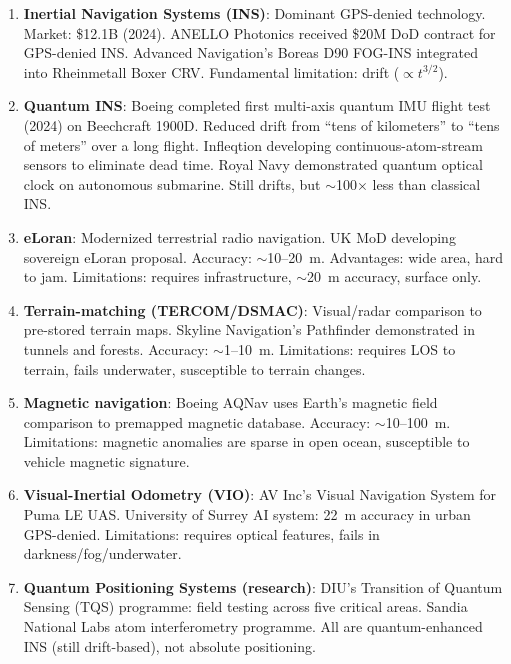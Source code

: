 \documentclass[11pt]{article}
\theoremstyle{definition}
\theoremstyle{remark}
\begin{document}
\begin{enumerate}
\item \textbf{Inertial Navigation Systems (INS)}: Dominant GPS-denied technology.
  Market: \$12.1B (2024). ANELLO Photonics received \$20M DoD contract for GPS-denied
  INS. Advanced Navigation's Boreas D90 FOG-INS integrated into Rheinmetall Boxer CRV.
  Fundamental limitation: drift ($\propto t^{3/2}$).

\item \textbf{Quantum INS}: Boeing completed first multi-axis quantum IMU flight test
  (2024) on Beechcraft 1900D. Reduced drift from ``tens of kilometers'' to ``tens of
  meters'' over a long flight. Infleqtion developing continuous-atom-stream sensors
  to eliminate dead time. Royal Navy demonstrated quantum optical clock on autonomous
  submarine. Still drifts, but $\sim$100$\times$ less than classical INS.

\item \textbf{eLoran}: Modernized terrestrial radio navigation. UK MoD developing
  sovereign eLoran proposal. Accuracy: $\sim$10--20~m. Advantages: wide area, hard
  to jam. Limitations: requires infrastructure, $\sim$20~m accuracy, surface only.

\item \textbf{Terrain-matching (TERCOM/DSMAC)}: Visual/radar comparison to pre-stored
  terrain maps. Skyline Navigation's Pathfinder demonstrated in tunnels and forests.
  Accuracy: $\sim$1--10~m. Limitations: requires LOS to terrain, fails underwater,
  susceptible to terrain changes.

\item \textbf{Magnetic navigation}: Boeing AQNav uses Earth's magnetic field comparison
  to premapped magnetic database. Accuracy: $\sim$10--100~m. Limitations: magnetic
  anomalies are sparse in open ocean, susceptible to vehicle magnetic signature.

\item \textbf{Visual-Inertial Odometry (VIO)}: AV Inc's Visual Navigation System for
  Puma LE UAS. University of Surrey AI system: 22~m accuracy in urban GPS-denied.
  Limitations: requires optical features, fails in darkness/fog/underwater.

\item \textbf{Quantum Positioning Systems (research)}: DIU's Transition of Quantum
  Sensing (TQS) programme: field testing across five critical areas. Sandia National
  Labs atom interferometry programme. All are quantum-enhanced INS (still drift-based),
  not absolute positioning.
\end{enumerate}
\end{document}
